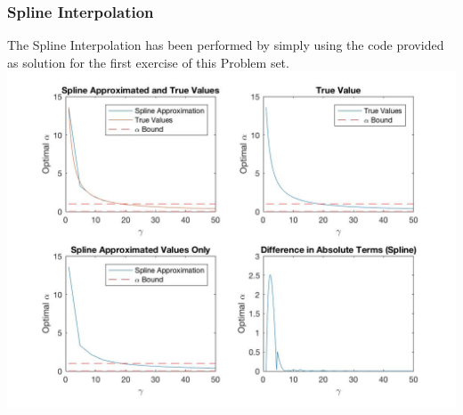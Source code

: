 \documentclass{article}
\begin{document}
\subsubsection{Spline Interpolation}
The Spline Interpolation has been performed by simply using the code provided as solution for the first exercise of this Problem set. \\
\includegraphics[width = \textwidth, keepaspectratio]{PS4Q3SPLINE.jpg} 
\end{document}
